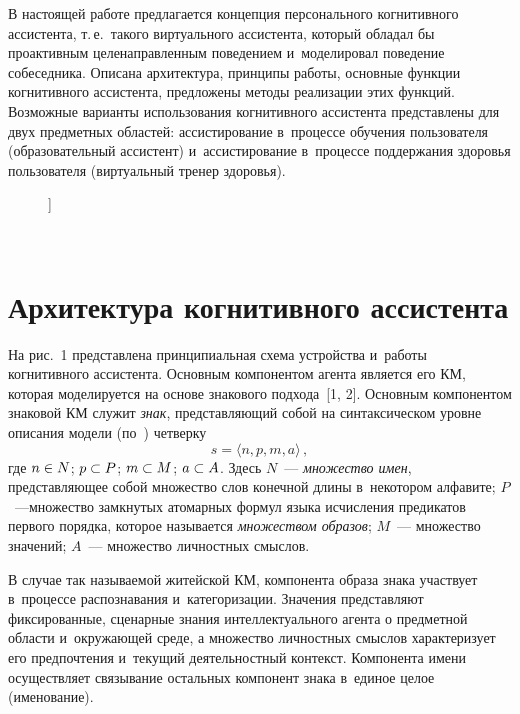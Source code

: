 \begin{multicols}{2}
  В настоящей работе предлагается концепция персонального когнитивного 
ассистента, т.\,е.\ такого виртуального ассистента, который обладал бы 
проактивным целенаправленным поведением и~моделировал поведение 
собеседника. Описана архитектура, принципы работы, основные 
функции когнитивного ассистента, предложены методы реализации этих 
функций. Возможные варианты использования когнитивного ассистента 
пред\-став\-ле\-ны для двух предметных областей: ассистирование в~процессе 
обучения пользователя (образовательный ассистент) и~ассистирование 
в~процессе поддержания здоровья пользователя (виртуальный тренер 
здоровья).

  \begin{figure*}] %
   \vspace*{1pt}
    \begin{center}  
  \mbox{%
 \epsfxsize=137.411mm 
 }
\end{center}
\vspace*{-9pt}
  \end{figure*}
 
 \vspace*{-14pt} 
  
\section{Архитектура когнитивного ассистента}

\vspace*{-4pt}

  На рис.~1 представлена принципиальная схема устройства и~работы 
когнитивного ассистента. Основным компонентом агента является его 
КМ, которая моделируется на основе знакового подхода~[1, 2]. 
Основным компонентом знаковой КМ служит \textit{знак}, 
представляющий собой на синтаксическом уровне описания модели  
(по~\cite{2-sm}) четверку  
$$
s=\langle n,p,m,a\rangle\,,
$$
 где $n\hm\in N$; 
$p\hm\subset P$; $m\hm\subset M$; $a\hm\subset A$. Здесь
$N$~--- \textit{множество 
имен}, представляющее собой множество слов конечной длины в~некотором 
алфавите; $P$~---\linebreak множество замкнутых атомарных формул языка исчис\-ле\-ния 
предикатов первого порядка, которое называется \textit{множеством образов}; 
$M$~--- множество значений; $A$~--- множество личностных смыслов.
  
  В случае так называемой житейской КМ, компонента образа знака 
участвует в~процессе распознавания и~категоризации. Значения представляют 
фиксированные, сценарные знания интеллектуального агента о предметной 
области и~окружающей среде, а множество личностных смыслов характеризует 
его предпочтения и~текущий деятельностный контекст. Компонента имени 
осуществляет связывание остальных компонент знака в~единое целое 
(именование).
  


\end{multicols}
